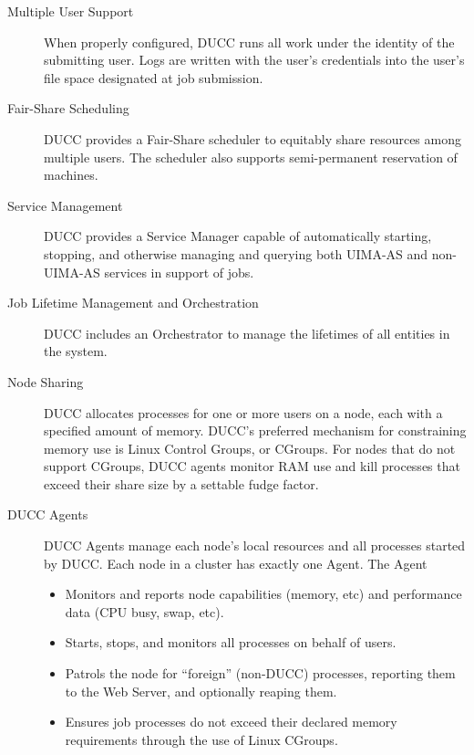     \begin{description}
        \item[Multiple User Support] When properly configured, 
          DUCC runs all work under the identity of the submitting user. Logs
          are written with the user's credentials into the user's file space designated at job
          submission.

        \item[Fair-Share Scheduling] DUCC provides a Fair-Share scheduler to equitably share
          resources among multiple users.  The scheduler also supports semi-permanent reservation of machines.

        \item[Service Management] DUCC provides a Service Manager capable of automatically starting, stopping, and
          otherwise managing and querying both UIMA-AS and non-UIMA-AS services in support of jobs.

        \item[Job Lifetime Management and Orchestration] DUCC includes an Orchestrator to manage the
          lifetimes of all entities in the system.

        \item[Node Sharing] DUCC allocates processes for one or more users on a node, each with a specified
          amount of memory.  DUCC's preferred mechanism for constraining memory use is Linux
          Control Groups, or CGroups.  For nodes that do not support CGroups, DUCC agents monitor
          RAM use and kill processes that exceed their share size by a settable fudge factor.

        \item[DUCC Agents] DUCC Agents manage each node's local resources and all
          processes started by DUCC. Each node in a cluster has exactly one Agent. The Agent
          \begin{itemize}
            \item Monitors and reports node capabilities (memory, etc) and performance data (CPU busy,
              swap, etc).
            \item Starts, stops, and monitors all processes on behalf of users.
            \item Patrols the node for ``foreign'' (non-DUCC) processes, reporting them to the
              Web Server, and optionally reaping them.
            \item Ensures job processes do not exceed their declared memory requirements
              through the use of Linux CGroups.
          \end{itemize}


\end{description}
